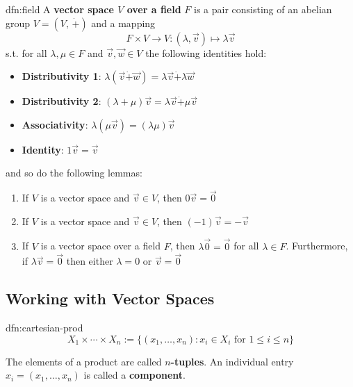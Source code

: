 \documentclass[landscape, 8pt]{extarticle}
\begin{document}
\begin{multicols}{3}
\begin{dfn}{dfn:field}{}
    A \textbf{vector space $V$ over a field} $F$ is a pair consisting of an abelian group $V = (V,\, \dot{+})$ and a mapping
    \[F \times V \to V : (\lambda, \vec{v})\mapsto \lambda \vec{v}\]
    s.t. for all $\lambda, \mu \in F$ and $\vec{v}, \vec{w}\in V$ the following identities hold:

    \vspace{-5pt}
    \begin{itemize}
        \setlength\itemsep{0em}
        \item \textbf{Distributivity 1}: $\lambda(\vec{v} \dot{+} \vec{w}) = \lambda\vec{v} \dot{+} \lambda \vec{w}$
        \item \textbf{Distributivity 2}: $(\lambda + \mu)\vec{v} = \lambda \vec{v} \dot{+} \mu \vec{v}$
        \item \textbf{Associativity}: $\lambda (\mu \vec{v}) = (\lambda \mu) \vec{v}$
        \item \textbf{Identity}: $1\vec{v} = \vec{v}$
    \end{itemize}
    \vspace{-5pt}
    and so do the following lemmas:

    \vspace{-5pt}
    \begin{enumerate}
        \setlength\itemsep{0em}
        \item If $V$ is a vector space and $\vec{v}\in V$, then $0 \vec{v} = \vec{0}$
        \item If $V$ is a vector space and $\vec{v}\in V$, then $(-1)\vec{v} = -\vec{v}$
        \item If $V$ is a vector space over a field $F$, then $\lambda \vec{0} = \vec{0}$ for all $\lambda\in F$. Furthermore, if $\lambda \vec{v} = \vec{0}$ then either $\lambda = 0$ or $\vec{v} = \vec{0}$
    \end{enumerate}
\end{dfn}

\subsection{Working with Vector Spaces}

\begin{dfn}{dfn:cartesian-prod}{}
    \[X_{1} \times \cdots \times X_{n} := \{(x_{1}, \dots, x_{n}) : x_{i}\in X_{i} \text{ for } 1 \le i \le n\}\]

    The elements of a product are called \textbf{$n$-tuples}. An individual entry $x_{i} = (x_{1}, \dots ,x_{n})$ is called a \textbf{component}.


\end{dfn}
\end{multicols}
\end{document}
